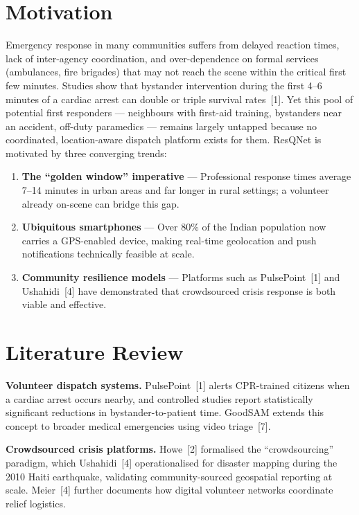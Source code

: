 \documentclass[12pt]{article}
\begin{document}
\section{Motivation}
Emergency response in many communities suffers from delayed reaction times, lack of inter-agency coordination, and over-dependence on formal services (ambulances, fire brigades) that may not reach the scene within the critical first few minutes. Studies show that bystander intervention during the first 4--6 minutes of a cardiac arrest can double or triple survival rates~[1]. Yet this pool of potential first responders --- neighbours with first-aid training, bystanders near an accident, off-duty paramedics --- remains largely untapped because no coordinated, location-aware dispatch platform exists for them. ResQNet is motivated by three converging trends:
\begin{enumerate}[nosep, leftmargin=1.4em]
  \item \textbf{The ``golden window'' imperative} --- Professional response times average 7--14 minutes in urban areas and far longer in rural settings; a volunteer already on-scene can bridge this gap.
  \item \textbf{Ubiquitous smartphones} --- Over 80\% of the Indian population now carries a GPS-enabled device, making real-time geolocation and push notifications technically feasible at scale.
  \item \textbf{Community resilience models} --- Platforms such as PulsePoint~[1] and Ushahidi~[4] have demonstrated that crowdsourced crisis response is both viable and effective.
\end{enumerate}

\section{Literature Review}
\textbf{Volunteer dispatch systems.}
PulsePoint~[1] alerts CPR-trained citizens when a cardiac arrest occurs nearby, and controlled studies report statistically significant reductions in bystander-to-patient time. GoodSAM extends this concept to broader medical emergencies using video triage~[7].

\textbf{Crowdsourced crisis platforms.}
Howe~[2] formalised the ``crowdsourcing'' paradigm, which Ushahidi~[4] operationalised for disaster mapping during the 2010 Haiti earthquake, validating community-sourced geospatial reporting at scale. Meier~[4] further documents how digital volunteer networks coordinate relief logistics.
\end{document}
